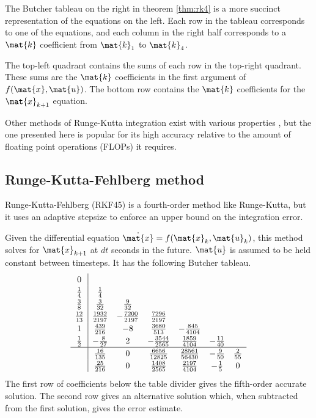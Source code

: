 The Butcher tableau on the right in theorem \ref{thm:rk4} is a more succinct
representation of the equations on the left. Each row in the tableau corresponds
to one of the equations, and each column in the right half corresponds to a
$\mat{k}$ coefficient from $\mat{k}_1$ to $\mat{k}_4$.

The top-left quadrant contains the sums of each row in the top-right quadrant.
These sums are the $\mat{k}$ coefficients in the first argument of
$f(\mat{x}, \mat{u})$. The bottom row contains the $\mat{k}$ coefficients for
the $\mat{x}_{k+1}$ equation.

Other methods of Runge-Kutta integration exist with various properties
\cite{bib:wiki_rk4}, but the one presented here is popular for its high accuracy
relative to the amount of floating point operations (FLOPs) it requires.

\subsection{Runge-Kutta-Fehlberg method}

Runge-Kutta-Fehlberg (RKF45) is a fourth-order method like Runge-Kutta, but it
uses an adaptive stepsize to enforce an upper bound on the integration error.
\begin{theorem}
  Given the differential equation $\dot{\mat{x}} = f(\mat{x}_k, \mat{u}_k)$,
  this method solves for $\mat{x}_{k+1}$ at $dt$ seconds in the future.
  $\mat{u}$ is assumed to be held constant between timesteps. It has the
  following Butcher tableau.
  \begin{equation*}
    \renewcommand\arraystretch{1.2}
    \begin{array}{c|ccccccc}
      0 \\
      \frac{1}{4} & \frac{1}{4} \\
      \frac{3}{8} & \frac{3}{32} & \frac{9}{32} \\
      \frac{12}{13} & \frac{1932}{2197} & -\frac{7200}{2197} & \frac{7296}{2197}
        \\
      1 & \frac{439}{216} & -8 & \frac{3680}{513} & -\frac{845}{4104} \\
      \frac{1}{2} & -\frac{8}{27} & 2 & -\frac{3544}{2565} & \frac{1859}{4104} &
        -\frac{11}{40} \\
      \hline
      & \frac{16}{135} & 0 & \frac{6656}{12825} & \frac{28561}{56430} &
        -\frac{9}{50} & \frac{2}{55} \\
      & \frac{25}{216} & 0 & \frac{1408}{2565} & \frac{2197}{4104} &
        -\frac{1}{5} & 0
    \end{array}
  \end{equation*}
  The first row of coefficients below the table divider gives the fifth-order
  accurate solution. The second row gives an alternative solution which,
  when subtracted from the first solution, gives the error estimate.
\end{theorem}


